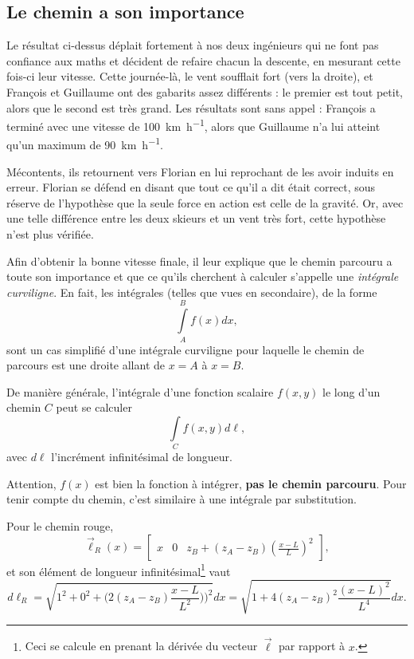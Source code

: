 \documentclass{cup-pan}
\begin{document}



\subsection{Le chemin a son importance}

Le résultat ci-dessus déplait fortement à nos deux ingénieurs qui ne font pas confiance aux maths et décident de refaire chacun la descente, en mesurant cette fois-ci leur vitesse. Cette journée-là, le vent soufflait fort (vers la droite), et François et Guillaume ont des gabarits assez différents : le premier est tout petit, alors que le second est très grand. Les résultats sont sans appel : François a terminé avec une vitesse de \SI{100}{\kilo\meter\per\hour}, alors que Guillaume n'a lui atteint qu'un maximum de \SI{90}{\kilo\meter\per\hour}.

Mécontents, ils retournent vers Florian en lui reprochant de les avoir induits en erreur. Florian se défend en disant que tout ce qu'il a dit était correct, sous réserve de l'hypothèse que la seule force en action est celle de la gravité. Or, avec une telle différence entre les deux skieurs et un vent très fort, cette hypothèse n'est plus vérifiée.

Afin d'obtenir la bonne vitesse finale, il leur explique que le chemin parcouru a toute son importance et que ce qu'ils cherchent à calculer s'appelle une \emph{intégrale curviligne}. En fait, les intégrales (telles que vues en secondaire), de la forme
\begin{equation}
    \int\limits_A^B f(x) dx,
\end{equation}
sont un cas simplifié d'une intégrale curviligne pour laquelle le chemin de parcours est une droite allant de $x=A$ à $x=B$.

De manière générale, l'intégrale d'une fonction scalaire $f(x,y)$ le long d'un chemin $C$ peut se calculer
\begin{equation}
    \int\limits_C f(x,y) d\ell,
\end{equation}
avec $d\ell$ l'incrément infinitésimal de longueur. 

Attention, $f(x)$ est bien la fonction à intégrer, \textbf{pas le chemin parcouru}. Pour tenir compte du chemin, c'est similaire à une intégrale par substitution.

Pour le chemin rouge, 
\begin{equation}
    \vec{\ell}_R(x) = \begin{bmatrix}x & 0 & z_B + (z_A - z_B)\left(\frac{x-L}{L}\right)^2\end{bmatrix},
\end{equation}
et son élément de longueur infinitésimal\footnote{Ceci se calcule en prenant la dérivée du vecteur $\vec{\ell}$ par rapport à $x$.} vaut
\begin{equation}
    d\ell_R = \sqrt{1^2 + 0^2 + \Big(2(z_A - z_B)\frac{x-L}{L^2})\Big)^2} dx = \sqrt{1  + 4(z_A-z_B)^2 \frac{(x-L)^2}{L^4}} dx.
\end{equation}
\end{document}
